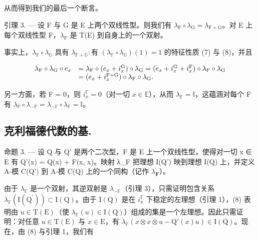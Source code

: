   从而得到我们的最后一个断言。

引理 3. --- 设 F 与 G 是 E 上两个双线性型。则我们有 \(\lambda_{\mathrm{F}} \circ \lambda_{\mathrm{G}} = \lambda_{\mathrm{F+G}}\)。对 E 上每个双线性型 F，\(\lambda_{\mathrm{F}}\) 是 T(E) 到自身上的一个双射。

  事实上，\(\lambda_{\mathbb{F}} \circ \lambda_{\mathbb{G}}\) 具有 \(\lambda_{\mathbb{F} + \mathbb{G}}: \text{有 } (\lambda_{\mathbb{F}} \circ \lambda_{\mathbb{G}})(1) = 1\) 的特征性质 (7) 与 (8)，并且

\[
\begin{array}{r l} \lambda_ {\mathrm{F}} \circ \lambda_ {\mathrm{G}} \circ e _ {x} & = \lambda_ {\mathrm{F}} \circ (e _ {x} + i _ {x} ^ {\mathrm{G}}) \circ \lambda_ {\mathrm{G}} = (e _ {x} + i _ {x} ^ {\mathrm{G}} + i _ {x} ^ {\mathrm{F}}) \circ \lambda_ {\mathrm{F}} \circ \lambda_ {\mathrm{G}} \\ & = (e _ {x} + i _ {x} ^ {\mathrm{F+G}}) \circ \lambda_ {\mathrm{F}} \circ \lambda_ {\mathrm{G}}. \end{array}
\]

  另一方面，若 F = 0，则 \(i_x^{\mathbb{F}} = 0\)（对一切 \(x \in \mathbb{E}\)），从而 \(\lambda_{\mathbb{F}} = \mathbb{I}\)，这蕴涵对每个 F 有 \(\lambda_{\mathbb{P}} \circ \lambda_{-\mathbb{P}} = \lambda_{-\mathbb{F}} \circ \lambda_{\mathbb{F}} = \mathbb{I}\)。

\subsection{克利福德代数的基.}

命题 3. --- 设 Q 与 Q' 是两个二次型，F 是 E 上一个双线性型，使得对一切 x ∈ E 有 Q'(x) = Q(x) + F(x, x)。映射 λ\_F 把理想 I(Q') 映到理想 I(Q) 上，并定义 A-模 C(Q') 到 A-模 C(Q) 上的一个同构（记作 \(\overline{\lambda_{\mathbf{F}}}\)）。

  由于 \(\lambda_{\mathbb{F}}\) 是一个双射，其逆双射是 \(\lambda_{-\mathbb{F}}\)（引理 3），只需证明包含关系 \(\lambda_{\mathbb{F}}(\mathrm{I}(\mathrm{Q}^{\prime})) \subset \mathrm{I}(\mathrm{Q})\)。由于 \(\mathrm{I}(\mathrm{Q})\) 是在 \(i_x^{\mathbb{F}}\) 下稳定的左理想（引理 1），(8) 表明由 \(u \in \mathrm{T}(\mathrm{E})\)（使 \(\lambda_{\mathbb{F}}(u) \in \mathrm{I}(\mathrm{Q})\)）组成的集是一个左理想。因此只需证明：对任意 \(u \in \mathrm{T}(\mathrm{E})\) 与 \(x \in \mathrm{E}\)，有 \(\lambda_{\mathbb{F}}(x \otimes x \otimes u - \mathrm{Q}'(x)u) \in \mathrm{I}(\mathrm{Q})\)。现在，由 (8) 与引理 1，我们有

